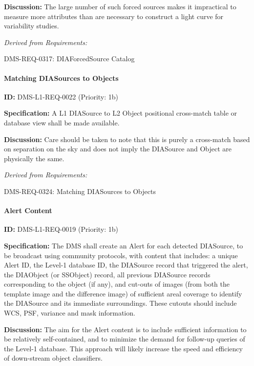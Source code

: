 \documentclass[SE,toc,lsstdraft]{lsstdoc}
\begin{document}
\textbf{Discussion: }The large number of such forced sources makes it impractical to measure more attributes than are necessary to construct a light curve for variability studies.

\emph{Derived from Requirements:}

DMS-REQ-0317:
DIAForcedSource Catalog \newline

\paragraph{Matching DIASources to Objects}\hfill  %

\label{DMS-L1-REQ-0022}
\textbf{ID:} DMS-L1-REQ-0022 (Priority: 1b)

\textbf{Specification:} A L1 DIASource to L2 Object positional cross-match table or database view shall be made available.

\textbf{Discussion:} Care should be taken to note that this is purely a cross-match based on separation on the sky and does not imply the DIASource and Object are physically the same.

\emph{Derived from Requirements:}

DMS-REQ-0324:
Matching DIASources to Objects \newline

\paragraph{Alert Content}\hfill  %

\label{DMS-L1-REQ-0019}
\textbf{ID:} DMS-L1-REQ-0019 (Priority: 1b)

\textbf{Specification:} The DMS shall create an Alert for each detected DIASource, to be broadcast using community protocols, with content that includes: a unique Alert ID, the Level-1 database ID, the DIASource record that triggered the alert, the DIAObject (or SSObject) record, all previous DIASource records corresponding to the object (if any), and cut-outs of images (from both the template image and the difference image) of sufficient areal coverage to identify the DIASource and its immediate surroundings. These cutouts should include WCS, PSF, variance and mask information.

\textbf{Discussion: }The aim for the Alert content is to include sufficient information to be relatively self-contained, and to minimize the demand for follow-up queries of the Level-1 database. This approach will likely increase the speed and efficiency of down-stream object classifiers.
\end{document}
